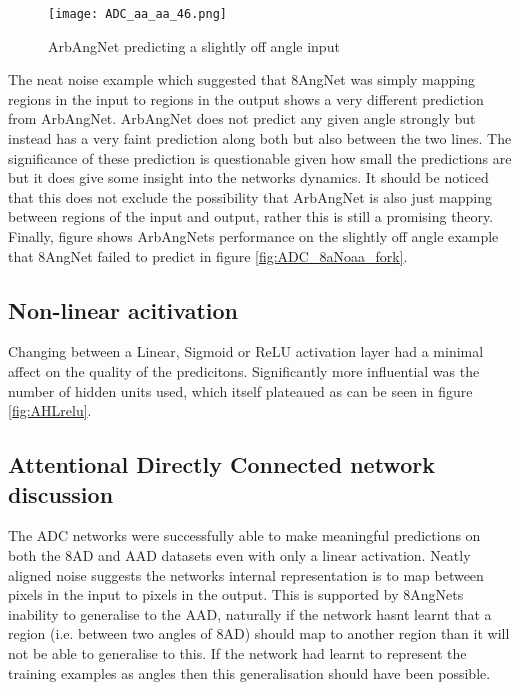 \begin{figure}[h]
    \centering
    \texttt{[image: ADC\_aa\_aa\_46.png]}
    \caption{ArbAngNet predicting a slightly off angle input}
    \label{fig:ADC_aaaa_fork}
\end{figure}


The neat noise example which suggested that 8AngNet was simply mapping regions in the input to regions in the output shows a very different prediction from ArbAngNet.
ArbAngNet does not predict any given angle strongly but instead has a very faint prediction along both but also between the two lines. 
The significance of these prediction is questionable given how small the predictions are but it does give some insight into the networks dynamics.
It should be noticed that this does not exclude the possibility that ArbAngNet is also just mapping between regions of the input and output, rather this is still a promising theory.
Finally, figure \cite{fig:ADC_aaaa_fork} shows ArbAngNets performance on the slightly off angle example that 8AngNet failed to predict in figure \ref{fig:ADC_8aNoaa_fork}.

\subsection{Non-linear acitivation}
Changing between a Linear, Sigmoid or ReLU activation layer had a minimal affect on the quality of the predicitons.
Significantly more influential was the number of hidden units used, which itself plateaued as can be seen in figure \ref{fig:AHLrelu}.

\subsection{Attentional Directly Connected network discussion}
The ADC networks were successfully able to make meaningful predictions on both the 8AD and AAD datasets even with only a linear activation.
Neatly aligned noise suggests the networks internal representation is to map between pixels in the input to pixels in the output.
This is supported by 8AngNets inability to generalise to the AAD, naturally if the network hasnt learnt that a region (i.e. between two angles of 8AD) should map to another region than it will not be able to generalise to this. 
If the network had learnt to represent the training examples as angles then this generalisation should have been possible. 


